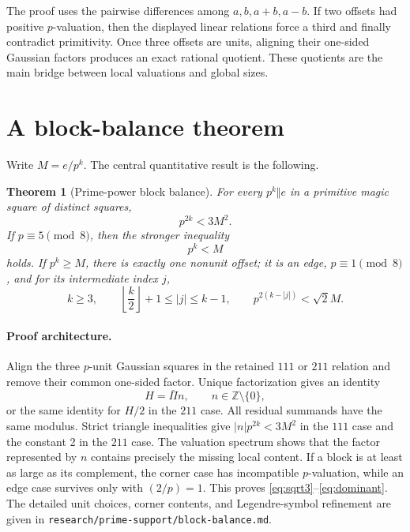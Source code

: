 \documentclass[11pt]{article}
\newtheorem{theorem}{Theorem}[section]
\theoremstyle{definition}
\theoremstyle{remark}
\newcommand{\Z}{\mathbb Z}
\begin{document}
The proof uses the pairwise differences among $a,b,a+b,a-b$.  If two offsets
had positive $p$-valuation, then the displayed linear relations force a third
and finally contradict primitivity.  Once three offsets are units, aligning
their one-sided Gaussian factors produces an exact rational quotient.  These
quotients are the main bridge between local valuations and global sizes.

\section{A block-balance theorem}

Write $M=e/p^k$.  The central quantitative result is the following.

\begin{theorem}[Prime-power block balance]
\label{thm:block}
For every $p^k\Vert e$ in a primitive magic square of distinct squares,
\begin{equation}
p^{2k}<3M^2.
\label{eq:sqrt3}
\end{equation}
If $p\equiv5\pmod8$, then the stronger inequality
\begin{equation}
p^k<M
\label{eq:mod8}
\end{equation}
holds.  If $p^k\ge M$, there is exactly one nonunit offset; it is an edge,
$p\equiv1\pmod8$, and for its intermediate index $j$,
\begin{equation}
k\ge3,\qquad
\left\lfloor\frac{k}{2}\right\rfloor+1\le |j|\le k-1,
\qquad p^{2(k-|j|)}<\sqrt2 M.
\label{eq:dominant}
\end{equation}
\end{theorem}

\paragraph{Proof architecture.}
Align the three $p$-unit Gaussian squares in the retained $111$ or $211$
relation and remove their common one-sided factor.  Unique factorization gives
an identity
\begin{equation}
H=\bar\Pi n,\qquad n\in\Z\setminus\{0\},
\end{equation}
or the same identity for $H/2$ in the $211$ case.  All residual summands have
the same modulus.  Strict triangle inequalities give $|n|p^{2k}<3M^2$ in the
$111$ case and the constant 2 in the $211$ case.  The valuation spectrum shows
that the factor represented by $n$ contains precisely the missing local
content.  If a block is at least as large as its complement, the corner case
has incompatible $p$-valuation, while an edge case survives only with
$(2/p)=1$.  This proves \eqref{eq:sqrt3}--\eqref{eq:dominant}.  The detailed
unit choices, corner contents, and Legendre-symbol refinement are given in
\texttt{research/prime-support/block-balance.md}.
\end{document}
